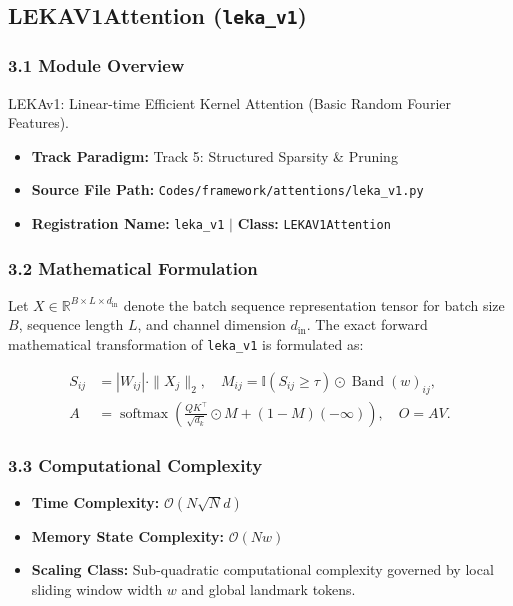 \subsection{LEKAV1Attention (\texttt{leka\_v1})}
\label{sec:app_module_leka_v1}

\subsubsection*{3.1 Module Overview}
LEKAv1: Linear-time Efficient Kernel Attention (Basic Random Fourier Features).
\begin{itemize}
    \item \textbf{Track Paradigm:} Track 5: Structured Sparsity \& Pruning
    \item \textbf{Source File Path:} \texttt{Codes/framework/attentions/leka\_v1.py}
    \item \textbf{Registration Name:} \texttt{leka\_v1} $\mid$ \textbf{Class:} \texttt{LEKAV1Attention}
\end{itemize}

\subsubsection*{3.2 Mathematical Formulation}
Let $X \in \mathbb{R}^{B \times L \times d_{\text{in}}}$ denote the batch sequence representation tensor for batch size $B$, sequence length $L$, and channel dimension $d_{\text{in}}$. The exact forward mathematical transformation of \texttt{leka\_v1} is formulated as:

\begin{align}
S_{ij} &= |W_{ij}| \cdot \|X_j\|_2, \quad M_{ij} = \mathbb{I}(S_{ij} \ge \tau) \odot \operatorname{Band}(w)_{ij}, \\
A &= \operatorname{softmax}\left(\frac{Q K^\top}{\sqrt{d_k}} \odot M + (1 - M)(-\infty)\right), \quad O = A V.
\end{align}


\subsubsection*{3.3 Computational Complexity}
\begin{itemize}
    \item \textbf{Time Complexity:} $\mathcal{O}(N \sqrt{N} d)$
    \item \textbf{Memory State Complexity:} $\mathcal{O}(N w)$
    \item \textbf{Scaling Class:} Sub-quadratic computational complexity governed by local sliding window width $w$ and global landmark tokens.
\end{itemize}

